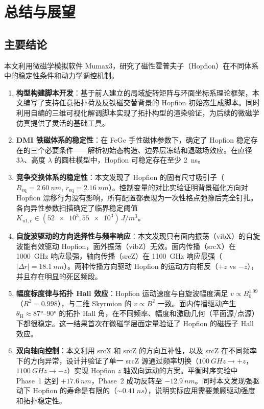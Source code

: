 \chapter{总结与展望}

\section{主要结论}

本文利用微磁学模拟软件 Mumax3，研究了磁性霍普夫子（Hopfion）在不同体系中的稳定性条件和动力学调控机制。

\begin{enumerate}[label=(\arabic*)]
  \item \textbf{构型构建脚本开发}：基于前人建立的局域旋转矩阵与环面坐标系理论框架，本文编写了支持任意拓扑荷及反铁磁交替背景的 Hopfion 初始态生成脚本。同时利用自编的三维可视化解调脚本实现了拓扑构型的渲染验证，为后续的微磁学仿真提供了灵活的基础工具。

  \item \textbf{DMI 铁磁体系的稳定性}：在 FeGe 手性磁体参数下，确定了 Hopfion 稳定存在的三个必要条件——解析初始态构造、边界层冻结和退磁场效应。在直径 $3\lambda$、高度 $\lambda$ 的圆柱模型中，Hopfion 可稳定存在至少 \SI{2}{ns}。

  \item \textbf{竞争交换体系的稳定性}：本文发现了 Hopfion 的固有尺寸吸引子（$R_{\text{eq}} = \SI{2.60}{nm}$, $r_{\text{eq}} = \SI{2.16}{nm}$）。控制变量的对比实验证明背景磁化方向对 Hopfion 漂移行为没有影响，所有配置都表现为一次性格点弛豫后完全钉扎。各向异性参数扫描确定了临界稳定阈值 $K_{u1,c} \in (\num{52e3}, \num{55e3}) \, \si{J/m^3}$。

  \item \textbf{自旋波驱动的方向选择性与频率响应}：本文发现只有面内振荡（vibX）的自旋波能有效驱动 Hopfion，面外振荡（vibZ）无效。面内传播（srcX）在 \SI{1000}{GHz} 响应最强，轴向传播（srcZ）在 \SI{1100}{GHz} 响应最强（$|\Delta r| = \SI{18.1}{nm}$）。两种传播方向驱动 Hopfion 的运动方向相反（$+z$ vs $-z$），并且存在明显的死区频段。

  \item \textbf{幅度标度律与拓扑 Hall 效应}：Hopfion 运动速度与自旋波幅度满足 $v \propto B_0^{1.99}$（$R^2 = 0.998$），与二维 Skyrmion 的 $v \propto B^2$ 一致。面内传播驱动产生 $\theta_{\text{H}} \approx \ang{87}$--$\ang{90}$ 的拓扑 Hall 角，在不同频率、幅度和激励几何（平面源/点源）下都很稳定。这一结果首次在微磁学层面定量验证了 Hopfion 的磁振子 Hall 效应。

  \item \textbf{双向轴向控制}：本文利用 srcX 和 srcZ 的方向互补性，以及 srcZ 在不同频率下的方向异常，设计并验证了单一 srcZ 源通过频率切换（$\SI{100}{GHz} \to +z$，$\SI{1100}{GHz} \to -z$）实现 Hopfion $z$ 轴双向运动的方案。平衡时序实验中 Phase~1 达到 $+\SI{17.6}{nm}$，Phase~2 成功反转至 $-\SI{12.9}{nm}$。同时本文发现强驱动下 Hopfion 的寿命是有限的（$\sim\SI{0.41}{ns}$），说明实际应用需要兼顾驱动强度和拓扑稳定性。
\end{enumerate}


